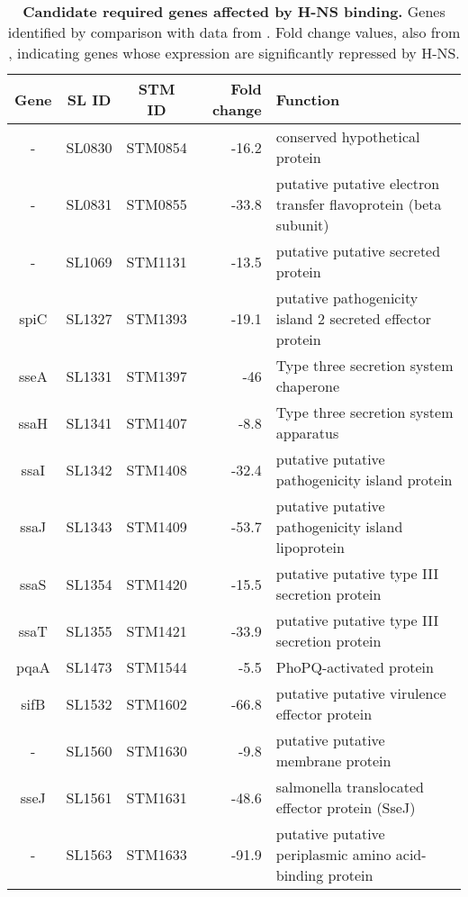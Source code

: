 %
\begin{table}
   \tiny
   \centering
   \noindent
    \caption[Candidate required genes affected by H-NS binding Typhimurium]{\textbf{Candidate required genes affected by H-NS binding.} Genes identified by comparison with data from \textcite{Navarre2006}. Fold change values, also from \textcite{Navarre2006}, indicating genes whose expression are significantly repressed by H-NS. }
    \begin{tabular}{ c
    				c
				c
				r
				l
				}
   
    \\
     \toprule
    \textbf{Gene} & \textbf{SL ID} & \textbf{STM ID} & \textbf{Fold change} & \textbf{Function} \\
    \midrule
    -     & SL0830 & STM0854 & -16.2 & conserved hypothetical protein \\
    -     & SL0831 & STM0855 & -33.8 & putative putative electron transfer flavoprotein (beta subunit) \\
    -     & SL1069 & STM1131 & -13.5 & putative putative secreted protein \\
    spiC  & SL1327 & STM1393 & -19.1 & putative pathogenicity island 2 secreted effector protein \\
    sseA  & SL1331 & STM1397 & -46   & Type three secretion system chaperone \\
    ssaH  & SL1341 & STM1407 & -8.8  & Type three secretion system apparatus \\
    ssaI  & SL1342 & STM1408 & -32.4 & putative putative pathogenicity island protein \\
    ssaJ  & SL1343 & STM1409 & -53.7 & putative putative pathogenicity island lipoprotein \\
            ssaS & SL1354 & STM1420 & -15.5 & putative putative type III secretion protein \\
    ssaT  & SL1355 & STM1421 & -33.9 & putative putative type III secretion protein \\
    pqaA  & SL1473 & STM1544 & -5.5  & PhoPQ-activated protein \\
    sifB  & SL1532 & STM1602 & -66.8 & putative putative virulence effector protein \\
    -     & SL1560 & STM1630 & -9.8  & putative putative membrane protein \\
    sseJ  & SL1561 & STM1631 & -48.6 & salmonella translocated effector protein (SseJ) \\
    -     & SL1563 & STM1633 & -91.9 & putative putative periplasmic amino acid-binding protein \\

\end{tabular}
\end{table}
